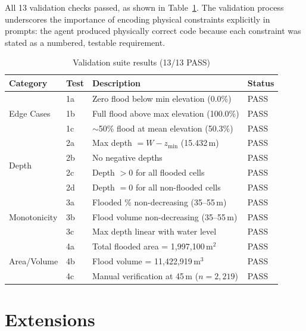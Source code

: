 \documentclass[12pt, a4paper]{article}
\begin{document}
All 13 validation checks passed, as shown in Table~\ref{tab:validation}. The validation process underscores the importance of encoding physical constraints explicitly in prompts: the agent produced physically correct code because each constraint was stated as a numbered, testable requirement.

\begin{table}[H]
  \centering
  \caption{Validation suite results (13/13 PASS)}
  \label{tab:validation}
  \begin{tabularx}{\textwidth}{llXl}
    \toprule
    \textbf{Category} & \textbf{Test} & \textbf{Description} & \textbf{Status} \\
    \midrule
    \multirow{3}{*}{Edge Cases}
      & 1a & Zero flood below min elevation (0.0\%)      & PASS \\
      & 1b & Full flood above max elevation (100.0\%)    & PASS \\
      & 1c & $\sim$50\% flood at mean elevation (50.3\%) & PASS \\
    \midrule
    \multirow{4}{*}{Depth}
      & 2a & Max depth $= W - z_{\min}$ (15.432\,m)  & PASS \\
      & 2b & No negative depths                        & PASS \\
      & 2c & Depth $> 0$ for all flooded cells          & PASS \\
      & 2d & Depth $= 0$ for all non-flooded cells      & PASS \\
    \midrule
    \multirow{3}{*}{Monotonicity}
      & 3a & Flooded \% non-decreasing (35--55\,m)     & PASS \\
      & 3b & Flood volume non-decreasing (35--55\,m)   & PASS \\
      & 3c & Max depth linear with water level          & PASS \\
    \midrule
    \multirow{3}{*}{Area/Volume}
      & 4a & Total flooded area = 1{,}997{,}100\,m$^2$    & PASS \\
      & 4b & Flood volume = 11{,}422{,}919\,m$^3$         & PASS \\
      & 4c & Manual verification at 45\,m ($n = 2{,}219$) & PASS \\
    \bottomrule
  \end{tabularx}
\end{table}

\section{Extensions}
\end{document}
